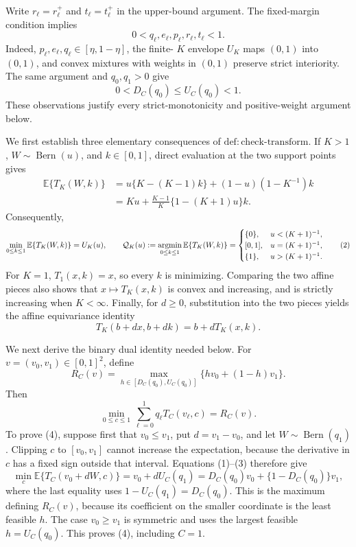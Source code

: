 Write \(r_\ell=r_\ell^+\) and \(t_\ell=t_\ell^+\) in the upper-bound argument.  The fixed-margin condition implies
\[
 0<q_\ell,e_\ell,p_\ell,r_\ell,t_\ell<1.
\]
Indeed, \(p_\ell,e_\ell,q_\ell\in[\eta,1-\eta]\), the finite-
\(K\) envelope \(U_K\) maps \((0,1)\) into \((0,1)\), and convex
mixtures with weights in \((0,1)\) preserve strict interiority.  The
same argument and \(q_0,q_1>0\) give
\[
 0<D_C(q_0)\leq U_C(q_0)<1.
\]
These observations justify every strict-monotonicity and positive-weight
argument below.

We first establish three elementary consequences of
\(\mathrm{def{:}check\text{-}transform}\).  If \(K>1\),
\(W\sim\operatorname{Bern}(u)\), and \(k\in[0,1]\), direct evaluation
at the two support points gives
\[
 \begin{aligned}
 \mathbb E\{T_K(W,k)\}
 &=u\{K-(K-1)k\}+(1-u)(1-K^{-1})k\\
 &=Ku+\frac{K-1}{K}\{1-(K+1)u\}k.                 \tag{1}
 \end{aligned}
\]
Consequently,
\[
 \min_{0\leq k\leq1}\mathbb E\{T_K(W,k)\}=U_K(u),
 \qquad
 \mathcal Q_K(u):=\mathop{\rm argmin}_{0\leq k\leq1}
 \mathbb E\{T_K(W,k)\}
 =
 \begin{cases}
 \{0\},&u<(K+1)^{-1},\\
 [0,1],&u=(K+1)^{-1},\\
 \{1\},&u>(K+1)^{-1}.
 \end{cases}                                                   \tag{2}
\]
For \(K=1\), \(T_1(x,k)=x\), so every \(k\) is minimizing.  Comparing
the two affine pieces also shows that \(x\mapsto T_K(x,k)\) is convex
and increasing, and is strictly increasing when \(K<\infty\).  Finally,
for \(d\geq0\), substitution into the two pieces yields the affine
equivariance identity
\[
 T_K(b+dx,b+dk)=b+dT_K(x,k).                         \tag{3}
\]

We next derive the binary dual identity needed below.  For
\(v=(v_0,v_1)\in[0,1]^2\), define
\[
 R_C(v)=\max_{h\in[D_C(q_0),U_C(q_0)]}
          \{hv_0+(1-h)v_1\}.
\]
Then
\[
 \min_{0\leq c\leq1}\sum_{\ell=0}^1q_\ell T_C(v_\ell,c)=R_C(v).
                                                               \tag{4}
\]
To prove (4), suppose first that \(v_0\leq v_1\), put
\(d=v_1-v_0\), and let \(W\sim\operatorname{Bern}(q_1)\).
Clipping \(c\) to \([v_0,v_1]\) cannot increase the expectation,
because the derivative in \(c\) has a fixed sign outside that interval.
Equations (1)--(3) therefore give
\[
 \min_c\mathbb E\{T_C(v_0+dW,c)\}
 =v_0+dU_C(q_1)
 =D_C(q_0)v_0+\{1-D_C(q_0)\}v_1,
\]
where the last equality uses
\(1-U_C(q_1)=D_C(q_0)\).  This is the maximum defining \(R_C(v)\),
because its coefficient on the smaller coordinate is the least feasible
\(h\).  The case \(v_0\geq v_1\) is symmetric and uses the largest
feasible \(h=U_C(q_0)\).  This proves (4), including \(C=1\).

